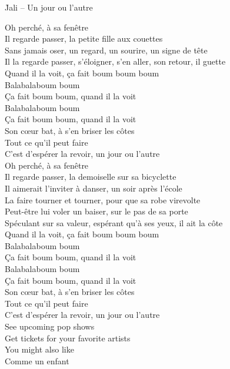\documentclass{novel}
\begin{document}
\newpage
\small
\h*{Jali – Un jour ou l’autre}
\begin{multicols}{2}
Oh perché, à sa fenêtre \\
Il regarde passer, la petite fille aux couettes \\
Sans jamais oser, un regard, un sourire, un signe de tête \\
Il la regarde passer, s'éloigner, s'en aller, son retour, il guette \\

Quand il la voit, ça fait boum boum boum \\
Balabalaboum boum \\
Ça fait boum boum, quand il la voit \\
Balabalaboum boum \\
Ça fait boum boum, quand il la voit \\
Son cœur bat, à s'en briser les côtes \\
Tout ce qu'il peut faire \\
C'est d'espérer la revoir, un jour ou l'autre \\

Oh perché, à sa fenêtre \\
Il regarde passer, la demoiselle sur sa bicyclette \\
Il aimerait l'inviter à danser, un soir après l'école \\
La faire tourner et tourner, pour que sa robe virevolte \\
Peut-être lui voler un baiser, sur le pas de sa porte \\
Spéculant sur sa valeur, espérant qu'à ses yeux, il ait la côte \\

Quand il la voit, ça fait boum boum boum \\
Balabalaboum boum \\
Ça fait boum boum, quand il la voit \\
Balabalaboum boum \\
Ça fait boum boum, quand il la voit \\
Son cœur bat, à s'en briser les côtes \\
Tout ce qu'il peut faire \\
C'est d'espérer la revoir, un jour ou l'autre \\
See upcoming pop shows \\
Get tickets for your favorite artists \\
You might also like \\
Comme un enfant \\


\end{multicols}
\end{document}
